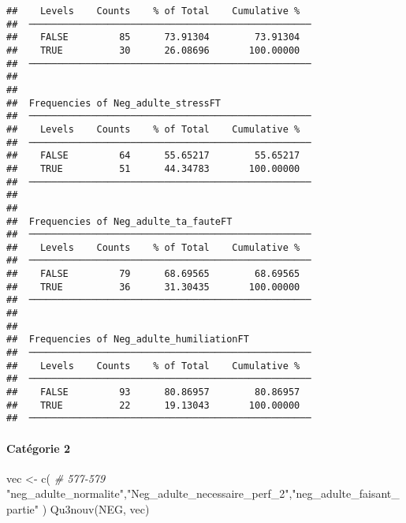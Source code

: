 \documentclass[
]{article}
\newenvironment{Shaded}{\begin{snugshade}}{\end{snugshade}}
\newcommand{\CommentTok}[1]{\textcolor[rgb]{0.56,0.35,0.01}{\textit{#1}}}
\newcommand{\FunctionTok}[1]{\textcolor[rgb]{0.00,0.00,0.00}{#1}}
\newcommand{\NormalTok}[1]{#1}
\newcommand{\OtherTok}[1]{\textcolor[rgb]{0.56,0.35,0.01}{#1}}
\newcommand{\StringTok}[1]{\textcolor[rgb]{0.31,0.60,0.02}{#1}}
\begin{document}
\begin{verbatim}
##    Levels    Counts    % of Total    Cumulative %   
##  ────────────────────────────────────────────────── 
##    FALSE         85      73.91304        73.91304   
##    TRUE          30      26.08696       100.00000   
##  ────────────────────────────────────────────────── 
## 
## 
##  Frequencies of Neg_adulte_stressFT                 
##  ────────────────────────────────────────────────── 
##    Levels    Counts    % of Total    Cumulative %   
##  ────────────────────────────────────────────────── 
##    FALSE         64      55.65217        55.65217   
##    TRUE          51      44.34783       100.00000   
##  ────────────────────────────────────────────────── 
## 
## 
##  Frequencies of Neg_adulte_ta_fauteFT               
##  ────────────────────────────────────────────────── 
##    Levels    Counts    % of Total    Cumulative %   
##  ────────────────────────────────────────────────── 
##    FALSE         79      68.69565        68.69565   
##    TRUE          36      31.30435       100.00000   
##  ────────────────────────────────────────────────── 
## 
## 
##  Frequencies of Neg_adulte_humiliationFT            
##  ────────────────────────────────────────────────── 
##    Levels    Counts    % of Total    Cumulative %   
##  ────────────────────────────────────────────────── 
##    FALSE         93      80.86957        80.86957   
##    TRUE          22      19.13043       100.00000   
##  ──────────────────────────────────────────────────
\end{verbatim}

\hypertarget{catuxe9gorie-2-5}{%
\paragraph{Catégorie 2}\label{catuxe9gorie-2-5}}

\begin{Shaded}
\begin{Highlighting}[]
\NormalTok{vec }\OtherTok{\textless{}{-}} \FunctionTok{c}\NormalTok{(   }\CommentTok{\# 577{-}579}
  \StringTok{"neg\_adulte\_normalite"}\NormalTok{,}\StringTok{"Neg\_adulte\_necessaire\_perf\_2"}\NormalTok{,}\StringTok{"neg\_adulte\_faisant\_partie"}
\NormalTok{)}
\FunctionTok{Qu3nouv}\NormalTok{(NEG, vec)}
\end{Highlighting}
\end{Shaded}
\end{document}
